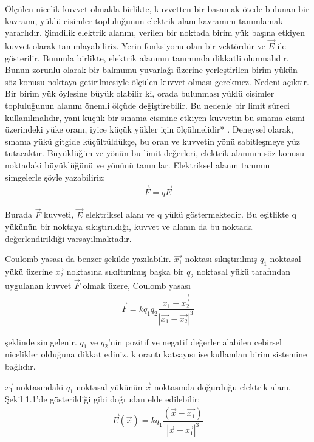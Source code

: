 Ölçülen nicelik kuvvet olmakla birlikte, kuvvetten bir basamak ötede bulunan bir kavramı, yüklü cisimler topluluğunun elektrik alanı kavramını tanımlamak yararlıdır. Şimdilik elektrik alanını, verilen bir noktada birim yük başına etkiyen kuvvet olarak tanımlayabiliriz. Yerin fonksiyonu olan bir vektördür ve $\Vec{E}$ ile gösterilir. Bununla birlikte, elektrik alanının tanımında dikkatli olunmalıdır. Bunun zorunlu olarak bir balmumu yuvarlağı üzerine yerleştirilen birim yükün söz konusu noktaya getirilmesiyle ölçülen kuvvet olması gerekmez. Nedeni açıktır. Bir birim yük öylesine büyük olabilir ki, orada bulunması yüklü cisimler topluluğunun alanını önemli ölçüde değiştirebilir. Bu nedenle bir limit süreci kullanılmalıdır, yani küçük bir sınama cismine etkiyen kuvvetin bu sınama cismi üzerindeki yüke oranı, iyice küçük yükler için ölçülmelidir* . Deneysel olarak, sınama yükü gitgide küçültüldükçe, bu oran ve kuvvetin yönü sabitleşmeye yüz tutacaktır. Büyüklüğün ve yönün bu limit değerleri, elektrik alanının söz konusu noktadaki büyüklüğünü ve yönünü tanımlar. Elektriksel alanın tanımını simgelerle şöyle yazabiliriz:
\begin{align}
    \Vec{F} = q \Vec{E}
\end{align}

Burada $\Vec{F}$ kuvveti, $\Vec{E}$ elektriksel alanı ve q yükü göstermektedir. Bu eşitlikte q yükünün bir noktaya sıkıştırıldığı, kuvvet ve alanın da bu noktada değerlendirildiği varsayılmaktadır.

Coulomb yasası da benzer şekilde yazılabilir. $\Vec{x_{1}}$ noktası sıkıştırılmış $q_{1}$ noktasal yükü üzerine  $\Vec{x_{2}}$ noktasına sıkıltırılmış başka bir $q_{2}$ noktasal yükü tarafından uygulanan kuvvet $\Vec{F}$ olmak üzere, Coulomb yasası
\begin{align}
    \Vec{F} = k q_{1} q_{2} \dfrac{\Vec{x_{1} - \Vec{x_{2}}}}{|\Vec{x_{1}} - \Vec{x_{2}}|^{3}}
\end{align}

şeklinde simgelenir. $q_{1}$ ve $q_{2}$'nin pozitif ve negatif değerler alabilen cebirsel nicelikler olduğuna dikkat ediniz. k orantı katsayısı ise kullanılan birim sistemine bağlıdır.

$\Vec{x_{1}}$ noktasındaki $q_{1}$ noktasal yükünün $\Vec{x}$ noktasında doğurduğu elektrik alanı, Şekil 1.1'de gösterildiği gibi doğrudan elde edilebilir:
\begin{align}
    \Vec{E} (\Vec{x}) = k q_{1} \dfrac{( \Vec{x} - \Vec{x_{1}})}{|\Vec{x} - \Vec{x_{1}}|^{3}}
\end{align}

